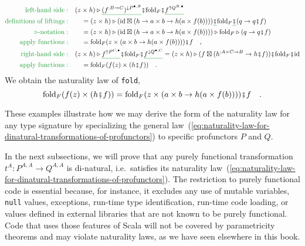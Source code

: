 \begin{align*}
{\color{greenunder}\text{left-hand side}:}\quad & (z\times h)\triangleright\gunderline{(f^{:B\rightarrow C})^{\downarrow P^{\bullet,B}}}\bef\text{fold}_{F}\bef\gunderline{f^{\uparrow Q^{B,\bullet}}}\\
{\color{greenunder}\text{definitions of liftings}:}\quad & \quad=(z\times h)\triangleright(\text{id}\boxtimes(h\rightarrow a\times b\rightarrow h(a\times f(b))))\gunderline{\bef}\text{fold}_{F}\gunderline{\bef}(q\rightarrow q\bef f)\\
{\color{greenunder}\triangleright\text{-notation}:}\quad & \quad=(z\times h)\triangleright(\text{id}\boxtimes(h\rightarrow a\times b\rightarrow h(a\times f(b))))\triangleright\text{fold}_{F}\triangleright(q\rightarrow q\bef f)\\
{\color{greenunder}\text{apply functions}:}\quad & \quad=\text{fold}_{F}(z\times(a\times b\rightarrow h(a\times f(b))))\bef f\quad,\\
{\color{greenunder}\text{right-hand side}:}\quad & (z\times h)\triangleright\gunderline{f^{\uparrow P^{C,\bullet}}}\bef\text{fold}_{F}\bef\gunderline{f^{\downarrow Q^{\bullet,C}}}=(z\times h)\triangleright(f\boxtimes(h^{:A\times C\rightarrow B}\rightarrow h\bef f))\bef\text{fold}_{F}\bef\text{id}\\
{\color{greenunder}\text{apply functions}:}\quad & \quad=\text{fold}_{F}(f(z)\times(h\bef f))\quad.
\end{align*}
We obtain the naturality law of \lstinline!fold!,
\[
\text{fold}_{F}(f(z)\times(h\bef f))=\text{fold}_{F}(z\times(a\times b\rightarrow h(a\times f(b))))\bef f\quad.
\]

These examples illustrate how we may derive the form of the naturality
law for any type signature by specializing the general law~(\ref{eq:naturality-law-for-dinatural-transformations-of-profunctors})
to specific profunctors $P$ and $Q$.

In the next subsections, we will prove that any purely functional
transformation $t^{A}:P^{A,A}\rightarrow Q^{A,A}$ is di-natural,
i.e.~satisfies its naturality law~(\ref{eq:naturality-law-for-dinatural-transformations-of-profunctors}).
The restriction to purely functional code is essential because, for
instance, it excludes any use of mutable variables, \lstinline!null!
values, exceptions, run-time type identification, run-time code loading,
or values defined in external libraries that are not known to be purely
functional. Code that uses those features of Scala will not be covered
by parametricity theorems and may violate naturality laws, as we have
seen elsewhere in this book.

